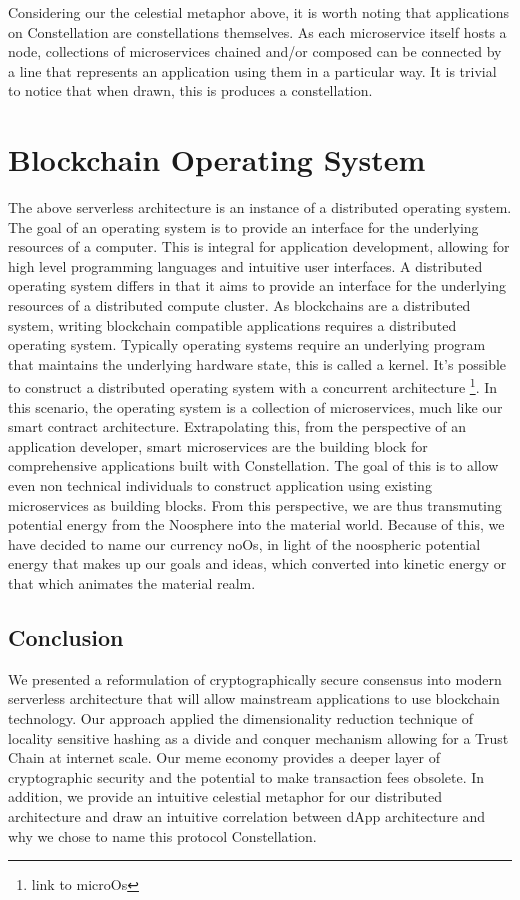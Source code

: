 \documentclass{article}
\begin{document}
Considering our the celestial metaphor above, it is worth noting that applications on Constellation are constellations themselves. As each microservice itself hosts a node, collections of microservices chained and/or composed can be connected by a line that represents an application using them in a particular way. It is trivial to notice that when drawn, this is produces a constellation.

\section{Blockchain Operating System}
The above serverless architecture is an instance of a distributed operating system. The goal of an operating system is to provide an interface for the underlying resources of a computer. This is integral for application development, allowing for high level programming languages and intuitive user interfaces. A distributed operating system differs in that it aims to provide an interface for the underlying resources of a distributed compute cluster. As blockchains are a distributed system, writing blockchain compatible applications requires a distributed operating system. Typically operating systems require an underlying program that maintains the underlying hardware state, this is called a kernel. It's possible to construct a distributed operating system with a concurrent architecture \footnote{link to microOs}. In this scenario, the operating system is a collection of microservices, much like our smart contract architecture. Extrapolating this, from the perspective of an application developer, smart microservices are the building block for comprehensive applications built with Constellation. The goal of this is to allow even non technical individuals to construct application using existing microservices as building blocks. From this perspective, we are thus transmuting potential energy from the Noosphere into the material world. Because of this, we have decided to name our currency noOs, in light of the noospheric potential energy that makes up our goals and ideas, which converted into kinetic energy or that which animates the material realm.

\subsection{Conclusion}
We presented a reformulation of cryptographically secure consensus into modern serverless architecture that will allow mainstream applications to use blockchain technology. Our approach applied the dimensionality reduction technique of locality sensitive hashing as a divide and conquer mechanism allowing for a Trust Chain at internet scale. Our meme economy provides a deeper layer of cryptographic security and the potential to make transaction fees obsolete. In addition, we provide an intuitive celestial metaphor for our distributed architecture and draw an intuitive correlation between dApp architecture and why we chose to name this protocol Constellation.


\end{document}
